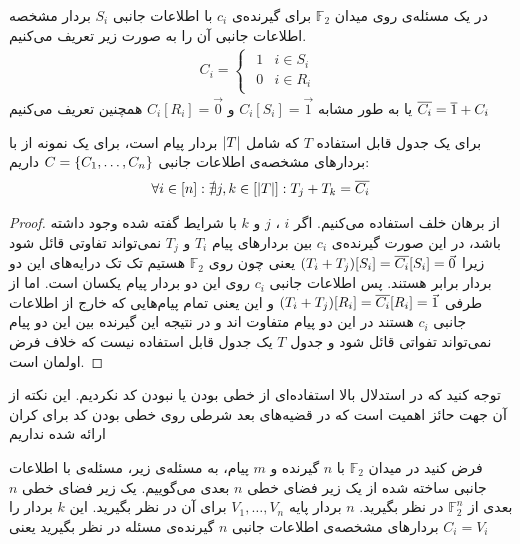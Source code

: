 \begin{definition}
	در یک مسئله‌ی
	\picod
	روی میدان
	$\mathbb{F}_2$
	برای گیرنده‌ی 
	$c_i$
	با اطلاعات جانبی
	$S_i$
	بردار مشخصه اطلاعات جانبی آن را به صورت زیر تعریف می‌کنیم.
	\begin{align}
		C_i =
		\begin{cases}
			\begin{array}{ll}
			1 & i \in S_i \\
			0 &  i \in R_i
		\end{array}
		\end{cases}
	\end{align}
	یا به طور مشابه
	$C_i[S_i] = \vec{1}$
	و
	$ C_i[R_i] = \vec{0}$
	همچنین تعریف می‌کنیم
	$\overline{C_i} = \overline{1} + C_i$
\end{definition}

\begin{lemma}
	\label{lemma:tableconstraint}
	برای یک جدول قابل استفاده
	$T$
	که شامل
	$\left|{T}\right|$
	بردار پیام است، برای یک نمونه از
	\picod
	با بردارهای مشخصه‌ی اطلاعات جانبی
	$C = \left\{ C_1, \ldots, C_n \right\}$
	داریم:
	\begin{align}
		\forall i \in [n]: \nexists j, k \in [\left|{T}\right|]: T_j + T_k = \overline{C_i}
	\end{align}
\end{lemma}
\begin{proof}
	از برهان خلف استفاده می‌کنیم. اگر
	$i$
	،
	$j$
	و
	$k$
	با شرایط گفته شده وجود داشته باشد، در این صورت گیرنده‌ی
	$c_i$
	بین بردارهای پیام
	$T_i$
	و
	$T_j$
	نمی‌تواند تفاوتی قائل شود زیرا
	$(T_i + T_j)[S_i] = \overline{C_i}[S_i] = \vec{0}$
	یعنی چون روی
	$\mathbb{F}_2$
	هستیم تک تک درایه‌های این دو بردار برابر هستند. پس اطلاعات جانبی
	$c_i$
	روی این دو بردار پیام یکسان است. اما از طرفی
	$(T_i + T_j)[R_i] = \overline{C_i}[R_i] = \vec{1}$
	و این یعنی تمام پیام‌هایی که خارج از اطلاعات جانبی
	$c_i$
	هستند در این دو پیام متفاوت اند و در نتیجه این گیرنده بین این دو پیام نمی‌تواند تفواتی قائل شود و جدول
	$T$
	یک جدول قابل استفاده نیست که خلاف فرض اولمان است.
\end{proof}
\begin{remark}
توجه کنید که در استدلال بالا استفاده‌ای از خطی بودن یا نبودن کد نکردیم. این نکته از آن جهت حائز اهمیت است که در قضیه‌های بعد شرطی روی خطی بودن کد برای کران ارائه شده نداریم
\end{remark}
\begin{definition}
	فرض کنید در میدان
	$\mathbb{F}_2$
	با 
	$n$
	گیرنده و 
	$m$
	پیام، به مسئله‌ی زیر، مسئله‌ی 
	\picod
	با اطلاعات جانبی ساخته شده از یک زیر فضای خطی
	$n$
	بعدی می‌گوییم. یک زیر فضای خطی 
	$n$
	بعدی از
	$\mathbb{F}^n_2$
	در نظر بگیرید.
	$n$
	بردار پایه
	$V_1, \ldots, V_n$
	برای آن در نظر بگیرید. این 
	$k$
	بردار را بردارهای مشخصه‌ی اطلاعات جانبی 
	$n$
	گیرنده‌ی مسئله در نظر بگیرید یعنی
	$C_i = V_i$
\end{definition}

